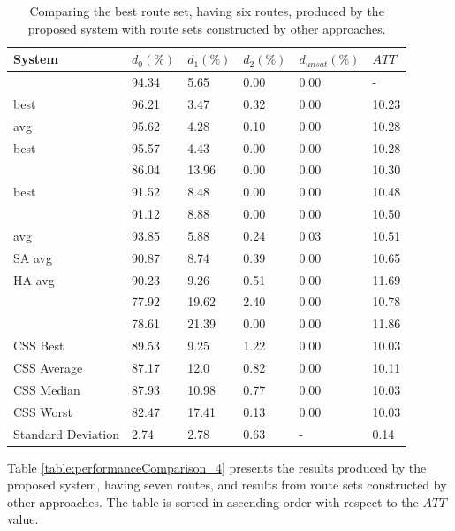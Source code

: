 \begin{table}[H]
    \centering
    \hspace*{-1.0cm}
    \begin{tabular}{|l||l|l|l|l|l|}
    \hline
    \textbf{System} & $d_0(\%)$ & $d_1(\%)$ & $d_2(\%)$ & $d_{unsat}(\%)$ & $ATT$ \\
    \hline
    \citet{nikolic14} & 94.34 & 5.65 & 0.00 & 0.00 & - \\
    \citet{kechagiopoulos14} best & 96.21 & 3.47 & 0.32 & 0.00 & 10.23 \\
    \citet{kechagiopoulos14} avg & 95.62 & 4.28 & 0.10 & 0.00 & 10.28 \\
    \citet{chew12} best & 95.57 & 4.43 & 0.00 & 0.00 & 10.28 \\
    \citet{chakroborty02} & 86.04 & 13.96 & 0.00 & 0.00 & 10.30 \\
    \citet{fan10} best & 91.52 & 8.48 & 0.00 & 0.00 & 10.48  \\
    \citet{zhang10} & 91.12 & 8.88 & 0.00 & 0.00 & 10.50 \\
    \citet{chew12} avg & 93.85 & 5.88 & 0.24 & 0.03 & 10.51 \\
    \citet{fan10} SA avg & 90.87 & 8.74 & 0.39 & 0.00 & 10.65 \\
    \citet{fan10} HA avg & 90.23 & 9.26 & 0.51 & 0.00 & 11.69 \\
    \citet{kidwai98} & 77.92 & 19.62 & 2.40 & 0.00 & 10.78 \\
    \citet{baaj91} & 78.61 & 21.39 & 0.00 & 0.00 & 11.86 \\
    \hline
    CSS Best & 89.53 & 9.25 & 1.22 & 0.00 & 10.03\\
    CSS Average & 87.17 & 12.0 & 0.82 & 0.00 & 10.11\\
    CSS Median & 87.93 & 10.98 & 0.77 & 0.00 & 10.03\\
    CSS Worst & 82.47 & 17.41 & 0.13 & 0.00 & 10.03\\
    Standard Deviation & 2.74 & 2.78 & 0.63 & - & 0.14\\
    \hline
    \end{tabular}
    \caption {Comparing the best route set, having six routes, produced by the proposed system with route sets constructed by other approaches.}
    \label{table:performanceComparison_6}
\end{table}

Table \vref{table:performanceComparison_4} presents the results produced by the proposed system, having seven routes, and results from route sets constructed by other approaches. The table is sorted in ascending order with respect to the $ATT$ value.

